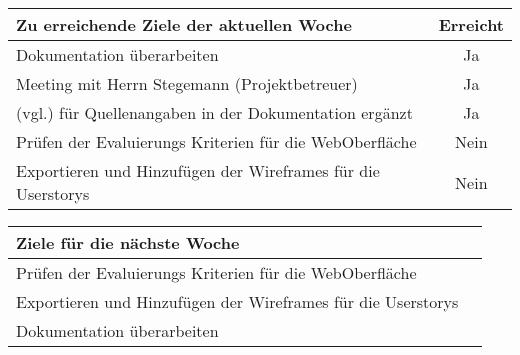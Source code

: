\begin{tabularx}{\textwidth}{Xc}
    \arrayrulecolor{OliveGreen}
    \toprule
    {\bfseries Zu erreichende Ziele der aktuellen Woche} & {\bfseries Erreicht} \\
    \midrule[2pt]
    Dokumentation überarbeiten                              &Ja              \\
    \rowcolor{OliveGreen!15}
    Meeting mit Herrn Stegemann (Projektbetreuer)           &Ja              \\
    \rowcolor{White}
    (vgl.) für Quellenangaben in der Dokumentation ergänzt  &Ja              \\
    \rowcolor{OliveGreen!15}
    Prüfen der Evaluierungs Kriterien für die WebOberfläche &Nein            \\
    \rowcolor{White}
    Exportieren und Hinzufügen der Wireframes für die Userstorys  &Nein      \\
    \bottomrule[2pt]
\end{tabularx}
%
\vspace{1cm}
%
\begin{tabularx}{\textwidth}{Xc}
    \arrayrulecolor{OliveGreen}
    \toprule
    {\bfseries Ziele für die nächste Woche}        &                         \\
    \midrule[2pt]
    Prüfen der Evaluierungs Kriterien für die WebOberfläche   &              \\
    \rowcolor{OliveGreen!15}
    Exportieren und Hinzufügen der Wireframes für die Userstorys  &          \\
    \rowcolor{White}
    Dokumentation überarbeiten                                  &            \\
\end{tabularx}
